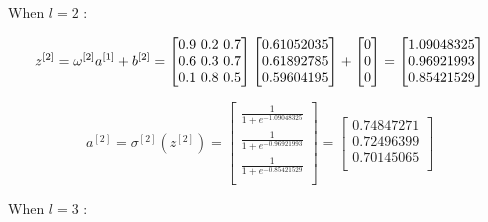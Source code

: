 \documentclass{article}
\begin{document}
\noindent When $l = 2$ :

\[
    z^{[2]} = \omega^{[2]} a^{[1]} + b^{[2]} = \begin{bmatrix}
        0.9 $ 0.2 $ 0.7 \\
        0.6 $ 0.3 $ 0.7 \\
        0.1 $ 0.8 $ 0.5 \\
    \end{bmatrix}
    \begin{bmatrix}
        0.61052035 \\
        0.61892785 \\
        0.59604195 \\
    \end{bmatrix}
    + \begin{bmatrix}
        0 \\
        0 \\
        0 \\
    \end{bmatrix}
    = \begin{bmatrix}
        1.09048325 \\
        0.96921993 \\
        0.85421529 \\
    \end{bmatrix}
\]

\[
    a^{[2]} = \sigma^{[2]}(z^{[2]}) = \begin{bmatrix}
        \frac{1}{1+e^{-1.09048325}} \\
        \frac{1}{1+e^{-0.96921993}} \\
        \frac{1}{1+e^{-0.85421529}} \\
    \end{bmatrix}
    = \begin{bmatrix}
        0.74847271 \\
        0.72496399 \\
        0.70145065 \\
    \end{bmatrix}
\]

\noindent When $l = 3$ :
\end{document}
